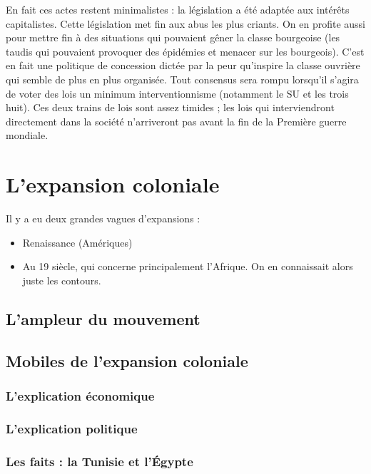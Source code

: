 \documentclass[12pt]{report}
\begin{document}
En fait ces actes restent minimalistes : la législation a été adaptée aux intérêts capitalistes.
Cette législation met fin aux abus les plus criants. On en profite aussi pour mettre fin à des
situations qui pouvaient gêner la classe bourgeoise (les taudis qui pouvaient provoquer des
épidémies et menacer sur les bourgeois). C’est en fait une politique de concession dictée par
la peur qu’inspire la classe ouvrière qui semble de plus en plus organisée. Tout consensus sera
rompu lorsqu’il s’agira de voter des lois un minimum interventionnisme (notamment le SU et
les trois huit). Ces deux trains de lois sont assez timides ; les lois qui interviendront
directement dans la société n’arriveront pas avant la fin de la Première guerre mondiale.

\section{L'expansion coloniale}

Il y a eu deux grandes vagues d’expansions :
\begin{itemize}
	\item Renaissance (Amériques)
	\item Au 19 siècle, qui concerne principalement l'Afrique. On en connaissait alors juste les contours.
\end{itemize}

\subsection{L'ampleur du mouvement}

\subsection{Mobiles de l'expansion coloniale}

\subsubsection{L'explication économique}

\subsubsection{L'explication politique}

\subsubsection{Les faits : la Tunisie et l'Égypte}
\end{document}
